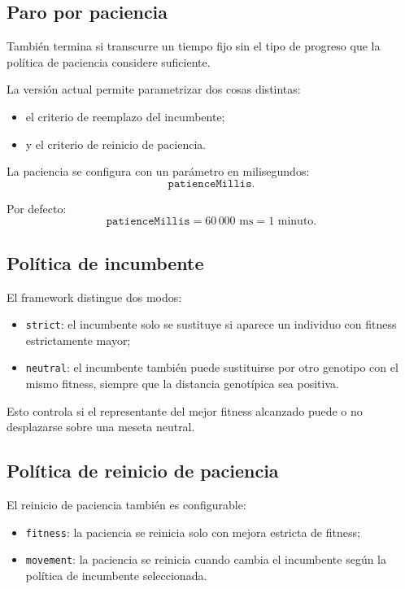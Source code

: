 \documentclass[11pt]{article}
\begin{document}
\subsection{Paro por paciencia}

Tambi\'en termina si transcurre un tiempo fijo sin el tipo de progreso que la
pol\'itica de paciencia considere suficiente.

La versi\'on actual permite parametrizar dos cosas distintas:

\begin{itemize}
  \item el criterio de reemplazo del incumbente;
  \item y el criterio de reinicio de paciencia.
\end{itemize}

La paciencia se configura con un par\'ametro en milisegundos:
\[
\texttt{patienceMillis}.
\]

Por defecto:
\[
\texttt{patienceMillis} = 60\,000 \text{ ms} = 1 \text{ minuto}.
\]

\subsection{Pol\'itica de incumbente}

El framework distingue dos modos:

\begin{itemize}
  \item \texttt{strict}: el incumbente solo se sustituye si aparece un
  individuo con fitness estrictamente mayor;
  \item \texttt{neutral}: el incumbente tambi\'en puede sustituirse por otro
  genotipo con el mismo fitness, siempre que la distancia genot\'ipica sea
  positiva.
\end{itemize}

Esto controla si el representante del mejor fitness alcanzado puede o no
desplazarse sobre una meseta neutral.

\subsection{Pol\'itica de reinicio de paciencia}

El reinicio de paciencia tambi\'en es configurable:

\begin{itemize}
  \item \texttt{fitness}: la paciencia se reinicia solo con mejora estricta de
  fitness;
  \item \texttt{movement}: la paciencia se reinicia cuando cambia el
  incumbente seg\'un la pol\'itica de incumbente seleccionada.
\end{itemize}
\end{document}
